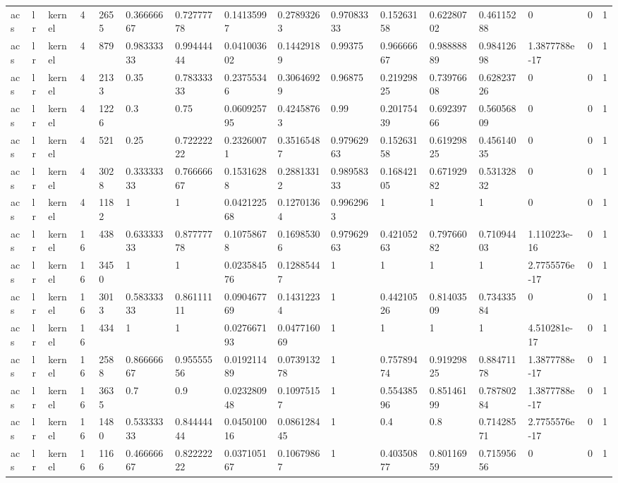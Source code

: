 \begin{tabular}{llllllllllllllll}
acs & lr & kernel & 4 & 2655 & 0.36666667 & 0.72777778 & 0.14135997 & 0.27893263 & 0.97083333 & 0.15263158 & 0.62280702 & 0.46115288 & 0 & 0 & 1 \\
acs & lr & kernel & 4 & 879 & 0.98333333 & 0.99444444 & 0.041003602 & 0.14429189 & 0.99375 & 0.96666667 & 0.98888889 & 0.98412698 & 1.3877788e-17 & 0 & 1 \\
acs & lr & kernel & 4 & 2133 & 0.35 & 0.78333333 & 0.23755346 & 0.30646929 & 0.96875 & 0.21929825 & 0.73976608 & 0.62823726 & 0 & 0 & 1 \\
acs & lr & kernel & 4 & 1226 & 0.3 & 0.75 & 0.060925795 & 0.42458763 & 0.99 & 0.20175439 & 0.69239766 & 0.56056809 & 0 & 0 & 1 \\
acs & lr & kernel & 4 & 521 & 0.25 & 0.72222222 & 0.23260071 & 0.35165487 & 0.97962963 & 0.15263158 & 0.61929825 & 0.45614035 & 0 & 0 & 1 \\
acs & lr & kernel & 4 & 3028 & 0.33333333 & 0.76666667 & 0.15316288 & 0.28813312 & 0.98958333 & 0.16842105 & 0.67192982 & 0.53132832 & 0 & 0 & 1 \\
acs & lr & kernel & 4 & 1182 & 1 & 1 & 0.042122568 & 0.12701364 & 0.9962963 & 1 & 1 & 1 & 0 & 0 & 1 \\
acs & lr & kernel & 16 & 438 & 0.63333333 & 0.87777778 & 0.10758678 & 0.16985306 & 0.97962963 & 0.42105263 & 0.79766082 & 0.71094403 & 1.110223e-16 & 0 & 1 \\
acs & lr & kernel & 16 & 3450 & 1 & 1 & 0.023584576 & 0.12885447 & 1 & 1 & 1 & 1 & 2.7755576e-17 & 0 & 1 \\
acs & lr & kernel & 16 & 3013 & 0.58333333 & 0.86111111 & 0.090467769 & 0.14312234 & 1 & 0.44210526 & 0.81403509 & 0.73433584 & 0 & 0 & 1 \\
acs & lr & kernel & 16 & 434 & 1 & 1 & 0.027667193 & 0.047716069 & 1 & 1 & 1 & 1 & 4.510281e-17 & 0 & 1 \\
acs & lr & kernel & 16 & 2588 & 0.86666667 & 0.95555556 & 0.019211489 & 0.073913278 & 1 & 0.75789474 & 0.91929825 & 0.88471178 & 1.3877788e-17 & 0 & 1 \\
acs & lr & kernel & 16 & 3635 & 0.7 & 0.9 & 0.023280948 & 0.10975157 & 1 & 0.55438596 & 0.85146199 & 0.78780284 & 1.3877788e-17 & 0 & 1 \\
acs & lr & kernel & 16 & 1480 & 0.53333333 & 0.84444444 & 0.045010016 & 0.086128445 & 1 & 0.4 & 0.8 & 0.71428571 & 2.7755576e-17 & 0 & 1 \\
acs & lr & kernel & 16 & 1166 & 0.46666667 & 0.82222222 & 0.037105167 & 0.10679867 & 1 & 0.40350877 & 0.80116959 & 0.71595656 & 0 & 0 & 1 \\

\end{tabular}
